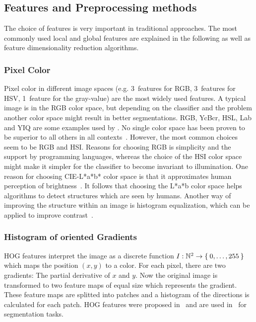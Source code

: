 
\subsection{Features and Preprocessing methods}\label{subsec:features}%
The choice of features is very important in traditional approaches.
The most commonly used local and global features are explained in the following
as well as feature dimensionality reduction algorithms.

\subsubsection{Pixel Color}
Pixel color in different image spaces (e.g. 3~features for RGB, 3~features for
HSV, 1~feature for the gray-value) are the most widely used features. A typical
image is in the RGB color space, but depending on the classifier and the
problem another color space might result in better segmentations. RGB, YcBcr,
HSL, Lab and YIQ are some examples used by \cite{cohen2015memory}. No single
color space has been proven to be superior to all others in all
contexts~\cite{cheng2001color}. However, the most common choices seem to be RGB
and HSI. Reasons for choosing RGB is simplicity and the support by programming
languages, whereas the choice of the HSI color space might make it simpler for
the classifier to become invariant to illumination. One reason for choosing
CIE-L*a*b* color space is that it approximates human perception of
brightness~\cite{kasson1992analysis}. It follows that choosing the L*a*b color
space helps algorithms to detect structures which are seen by humans. Another
way of improving the structure within an image is histogram equalization, which
can be applied to improve contrast~\cite{pizer1987adaptive,4228537}.

\subsubsection{Histogram of oriented Gradients}
\Gls{HOG} features interpret the image as a discrete function
$I: \mathbb{N}^2 \rightarrow \Set{0, \dots, 255}$ which maps the position $(x,
y)$ to a color. For each pixel, there are two gradients: The partial derivative
of $x$ and $y$. Now the original image is transformed to two feature maps of
equal size which represents the gradient. These feature maps are splitted into
patches and a histogram of the directions is calculated for each patch.
\gls{HOG} features were proposed in~\cite{1467360} and are used
in~\cite{bourdev2010detecting,felzenszwalb2010object} for segmentation tasks.


